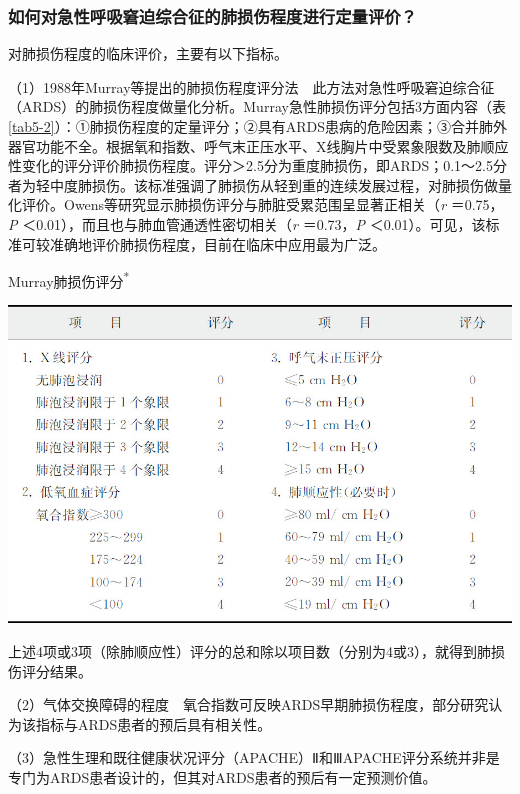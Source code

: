 \subsubsection{如何对急性呼吸窘迫综合征的肺损伤程度进行定量评价？}

对肺损伤程度的临床评价，主要有以下指标。

（1）1988年Murray等提出的肺损伤程度评分法　此方法对急性呼吸窘迫综合征（ARDS）的肺损伤程度做量化分析。Murray急性肺损伤评分包括3方面内容（表\ref{tab5-2}）：①肺损伤程度的定量评分；②具有ARDS患病的危险因素；③合并肺外器官功能不全。根据氧和指数、呼气末正压水平、X线胸片中受累象限数及肺顺应性变化的评分评价肺损伤程度。评分＞2.5分为重度肺损伤，即ARDS；0.1～2.5分者为轻中度肺损伤。该标准强调了肺损伤从轻到重的连续发展过程，对肺损伤做量化评价。Owens等研究显示肺损伤评分与肺脏受累范围呈显著正相关（\emph{r}
＝0.75，\emph{P} ＜0.01），而且也与肺血管通透性密切相关（\emph{r}
＝0.73，\emph{P}
＜0.01）。可见，该标准可较准确地评价肺损伤程度，目前在临床中应用最为广泛。

\begin{table}[htbp]
{\centering
\caption{Murray肺损伤评分\textsuperscript{*}}
\label{tab5-2}
\includegraphics{./images/Image00047.jpg}}

\footnotesize *
上述4项或3项（除肺顺应性）评分的总和除以项目数（分别为4或3），就得到肺损伤评分结果。
\end{table}



（2）气体交换障碍的程度　氧合指数可反映ARDS早期肺损伤程度，部分研究认为该指标与ARDS患者的预后具有相关性。

（3）急性生理和既往健康状况评分（APACHE）Ⅱ和ⅢAPACHE评分系统并非是专门为ARDS患者设计的，但其对ARDS患者的预后有一定预测价值。

